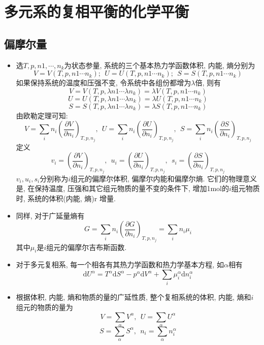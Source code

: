 \section{多元系的复相平衡的化学平衡}


\subsection{偏摩尔量}
\begin{itemize}
    \item 选$T,p,n1,\cdots,n_k$为状态参量, 系统的三个基本热力学函数体积, 内能, 熵分别为
          $$
              V=V(T,p,n1\cdots n_k); \ \ U=U(T,p,n1\cdots n_k); \ \
              S=S(T,p,n1\cdots n_k)
          $$
          如果保持系统的温度和压强不变, 令系统中各组份都增为$\lambda$倍, 则有
          $$
              V=V(T,p,\lambda n1\cdots \lambda n_k)=\lambda V(T,p,n1\cdots n_k)
          $$
          $$
              U=U(T,p,\lambda n1\cdots \lambda n_k)=\lambda U(T,p,n1\cdots n_k)
          $$
          $$
              S=S(T,p,\lambda n1\cdots \lambda n_k)=\lambda S(T,p,n1\cdots n_k)
          $$
          由欧勒定理可知:
          $$
              V=\sum_in_i\left(\frac{\partial V}{\partial n_i}\right)_{T,p,n_j}, \
              \ U=\sum_in_i\left(\frac{\partial U}{\partial n_i}\right)_{T,p,n_j},
              \ \ S=\sum_in_i\left(\frac{\partial S}{\partial n_i}\right)_{T,p,n_j}
          $$
          定义
          $$
              v_i=\left(\frac{\partial V}{\partial n_i}\right)_{T,p,n_j}, \ \
              u_i=\left(\frac{\partial U}{\partial n_i}\right)_{T,p,n_j}, \ \
              s_i=\left(\frac{\partial S}{\partial n_i}\right)_{T,p,n_j}
          $$
          $v_i,u_i,s_i$分别称为$i$组元的偏摩尔体积, 偏摩尔内能和偏摩尔熵. 它们的物理意义是, 在保持温度, 压强和其它组元物质的量不变的条件下, 增加1mol的$i$组元物质时, 系统的体积(内能, 熵)r
          增量.
    \item 同样, 对于广延量熵有
          $$
              G=\sum_in_i\left(\frac{\partial G}{\partial
                  n_i}\right)_{T,p,n_j}=\sum_in_i\mu_i
          $$
          其中$\mu_i$是$i$组元的偏摩尔吉布斯函数.
    \item 对于多元复相系, 每一个相各有其热力学函数和热力学基本方程, 如$\alpha$相有
          $$
              \mathrm{d}U^\alpha=T^\alpha\mathrm{d}S^\alpha-p^\alpha\mathrm{d}V^\alpha+\sum_i\mu_i^\alpha\mathrm{d}n_i^\alpha
          $$
    \item 根据体积, 内能, 熵和物质的量的广延性质, 整个复相系统的体积, 内能, 熵和$i$组元的物质的量为
          $$
              V=\sum_\alpha V^\alpha, \ \ U=\sum_\alpha U^\alpha
          $$
          $$
              S=\sum_\alpha S^\alpha, \ \ n_i=\sum_\alpha n_i^\alpha
          $$
\end{itemize}

